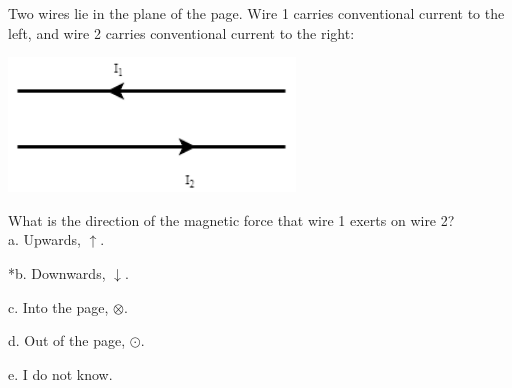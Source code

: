 
Two wires lie in the plane of the page. Wire 1 carries conventional current to the left, and wire 2 carries conventional current to the right:

\includegraphics[width=3in]{../../Images/FieldsEBHQ15.png}

What is the direction of the magnetic force that wire 1 exerts on wire 2?\\

a. Upwards, $\uparrow$.

*b. Downwards, $\downarrow$.

c. Into the page, $\otimes$.

d. Out of the page, $\odot$.

e. I do not know.\\
